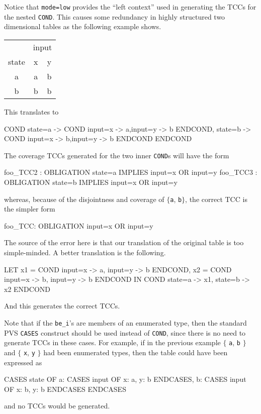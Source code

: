 Notice that \texttt{mode=low} provides the ``left context'' used in
generating the TCCs for the nested \texttt{COND}.  This causes some
redundancy in highly structured two dimensional tables as the
following example shows.
\begin{center}
\begin{tabular}{|c||c|c|}
\hline
 & \multicolumn{2}{c|}{input}\\
\cline{2-3}
state & x & y\\
\hline
\hline
a & a & b\\
\hline
b & b & b\\
\hline
\end{tabular}
\end{center}
This translates to
\begin{pvsex}
  COND
    state=a -> COND input=x -> a,input=y -> b ENDCOND,
    state=b -> COND input=x -> b,input=y -> b ENDCOND
  ENDCOND
\end{pvsex}
The coverage TCCs generated for the two inner \texttt{COND}s will have the form
\begin{pvsex}
   foo\_TCC2 : OBLIGATION state=a IMPLIES input=x OR input=y
   foo\_TCC3 : OBLIGATION state=b IMPLIES input=x OR input=y
\end{pvsex}
whereas, because of the disjointness and coverage of $\{$\texttt{a}, \texttt{b}$\}$, the correct TCC is the simpler form
\begin{pvsex}
   foo\_TCC: OBLIGATION input=x OR input=y
\end{pvsex}
The source of the error here is that our translation of the original
table is too simple-minded.  A better translation is the following.
\begin{pvsex}
  LET
    x1 = COND input=x -> a, input=y -> b ENDCOND,
    x2 = COND input=x -> b, input=y -> b ENDCOND
  IN
    COND state=a -> x1, state=b -> x2 ENDCOND
\end{pvsex}
And this generates the correct TCCs.

Note that if the \texttt{be\_i}'s are members of an enumerated type, then
the standard PVS \texttt{CASES} construct should be used instead of \texttt{COND}, since there is no need to generate TCCs in these cases.  For
example, if in the previous example $\{$ \texttt{a}, \texttt{b} $\}$ and
$\{$ \texttt{x}, \texttt{y} $\}$ had been enumerated types, then the table
could have been expressed as
\begin{pvsex}
  CASES state OF
    a: CASES input OF x: a, y: b ENDCASES,
    b: CASES input OF x: b, y: b ENDCASES
  ENDCASES
\end{pvsex}
and no TCCs would be generated.

